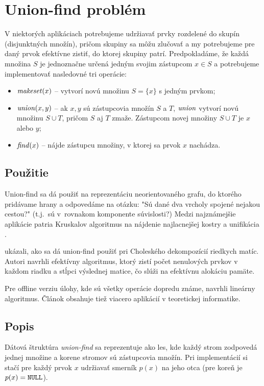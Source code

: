 \chapter{Union-find problém}\label{chap:uf}

V niektorých aplikáciach potrebujeme udržiavať prvky rozdelené do skupín
(disjunktných množín), pričom skupiny sa môžu zlučovať a my potrebujeme
pre daný prvok efektívne zistiť, do ktorej skupiny patrí. Predpokladáme,
že každá množina $S$ je jednoznačne určená jedným svojim zástupcom $x\in S$
a potrebujeme implementovať nasledovné tri operácie:

\begin{itemize}
\item $\mathop{\mathit{makeset}}(x)$ -- vytvorí novú množinu $S=\{x\}$ s jedným prvkom; %
\item $\mathop{\mathit{union}}(x, y)$ -- ak $x, y$ sú zástupcovia množín $S$ a $T$,
                 $\mathop{\mathit{union}}$ vytvorí novú množinu $S\cup T$,
                 pričom $S$ aj $T$ zmaže. Zástupcom novej množiny $S\cup T$
                 je $x$ alebo $y$;
\item $\mathop{\mathit{find}}(x)$ -- nájde zástupcu množiny, v ktorej sa 
                prvok $x$ nachádza.
\end{itemize}
 
\section{Použitie}\label{sec:uf-pouzitie}

Union-find sa dá použiť na reprezentáciu neorientovaného grafu,
do ktorého pridávame hrany a odpovedáme na otázku: "Sú dané dva
vrcholy spojené nejakou cestou?" (t.j.\ sú v~rovnakom komponente súvislosti?)
Medzi najznámejšie aplikácie patria Kruskalov algoritmus na nájdenie najlacnejšej
kostry \citep{kruskal} a unifikácia \citep{unif}.

\citet{cholesky} ukázali, ako sa dá union-find použiť pri Choleského dekompozícií
riedkych matíc. Autori navrhli efektívny algoritmus, ktorý zistí počet nenulových
prvkov v každom riadku a stĺpci výslednej matice, čo slúži na efektívnu alokáciu
pamäte.

Pre offline verziu úlohy, kde sú všetky operácie dopredu známe, \citet{offline-uf}
navrhli lineárny algoritmus. Článok obsahuje tiež viacero aplikácií v teoretickej
informatike.

\section{Popis}
Dátová štruktúra \emph{union-find} sa reprezentuje ako les, kde každý strom zodpovedá
jednej množine a korene stromov sú zástupcovia množín. Pri implementácií si
stačí pre každý prvok $x$ udržiavať smerník $p(x)$ na jeho otca
(pre koreň je $p(x)=\texttt{NULL}$).

